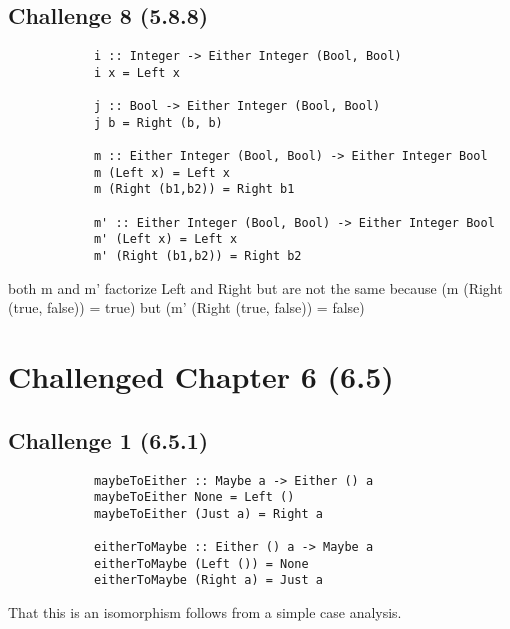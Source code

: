\documentclass[11pt]{article}
\begin{document}
    \subsection*{Challenge 8 (5.8.8)}
        \begin{verbatim}
            i :: Integer -> Either Integer (Bool, Bool)
            i x = Left x

            j :: Bool -> Either Integer (Bool, Bool)
            j b = Right (b, b)

            m :: Either Integer (Bool, Bool) -> Either Integer Bool
            m (Left x) = Left x 
            m (Right (b1,b2)) = Right b1

            m' :: Either Integer (Bool, Bool) -> Either Integer Bool
            m' (Left x) = Left x 
            m' (Right (b1,b2)) = Right b2
        \end{verbatim}

        both m and m' factorize Left and Right but are not the same because (m (Right (true, false)) = true) but (m' (Right (true, false)) = false)

\section*{Challenged Chapter 6 (6.5)}
    \subsection*{Challenge 1 (6.5.1)}
        \begin{verbatim}
            maybeToEither :: Maybe a -> Either () a
            maybeToEither None = Left ()
            maybeToEither (Just a) = Right a

            eitherToMaybe :: Either () a -> Maybe a 
            eitherToMaybe (Left ()) = None
            eitherToMaybe (Right a) = Just a
        \end{verbatim}
        That this is an isomorphism follows from a simple case analysis. 
\end{document}
